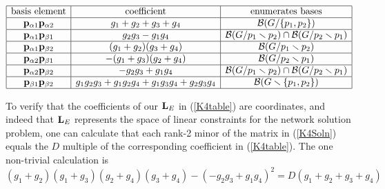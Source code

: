 \begin{equation}\label{K4table}
\begin{array}{|c|c|c|} \hline
\text{basis element} & \text{coefficient} & \text{enumerates bases}\\
  \hline

\mathbf{p}_{\alpha 1}\mathbf{p}_{\alpha 2} &
g_1 + g_2 + g_3 + g_4 & \mathcal{B}(G/\{p_1, p_2\})

\\ \hline

\mathbf{p}_{\alpha 1}\mathbf{p}_{\beta 1} &
g_2g_3 - g_1g_4 &  \mathcal{B}(G/p_1\smallsetminus p_2)\cap\mathcal{B}(G/p_2\smallsetminus p_1)

\\ \hline

\mathbf{p}_{\alpha 1}\mathbf{p}_{\beta 2} &
(g_1 + g_2)(g_3 + g_4) & \mathcal{B}(G/p_1\smallsetminus p_2)
\\ \hline 

\mathbf{p}_{\alpha 2}\mathbf{p}_{\beta 1} & -(g_1 + g_3)(g_2+g_4) & \mathcal{B}(G/p_2\smallsetminus p_1)
\\ \hline
 
\mathbf{p}_{\alpha 2}\mathbf{p}_{\beta 2} &
-g_2g_3 + g_1g_4 & \mathcal{B}(G/p_1\smallsetminus p_2)\cap\mathcal{B}(G/p_2\smallsetminus p_1)
\\ \hline
 
\mathbf{p}_{\beta 1}\mathbf{p}_{\beta 2} &
g_1g_2g_3 + g_1g_2g_4 + g_1g_3g_4 + g_2g_3g_4 & \mathcal{B}(G\smallsetminus \{p_1, p_2\})
\\ \hline

\end{array}
\end{equation}

To verify that the coefficients of our $\mathbf{L}_E$
in (\ref{K4table}) are \Plucker coordinates, and
indeed that $\mathbf{L}_E$ represents the space of
linear constraints for the
network solution problem,
one can calculate that each rank-2 minor of the matrix in
(\ref{K4Soln}) equals the $D$ multiple of the corresponding coefficient
in  (\ref{K4table}).  The one non-trivial calculation is
\[
{\left(g_{1} + g_{2}\right)} {\left(g_{1} + g_{3}\right)} {\left(g_{2} + g_{4}\right)} {\left(g_{3} + g_{4}\right)} - {\left(-g_{2} g_{3} + g_{1} g_{4}\right)}^{2} = D(g_1+g_2+g_3+g_4)
\]
